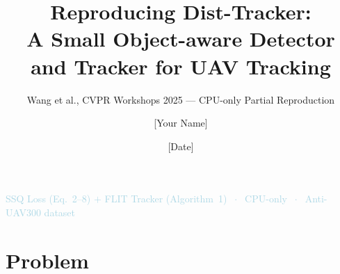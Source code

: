 \documentclass[aspectratio=169, 10pt]{beamer}
\title[Dist-Tracker Reproduction]{%
  Reproducing Dist-Tracker:\\
  A Small Object-aware Detector and Tracker for UAV Tracking}
\subtitle{Wang et al., CVPR Workshops 2025 — CPU-only Partial Reproduction}
\author{[Your Name]}
\date{[Date]}
\institute{[Your Institution]}
\begin{document}

\begin{frame}[plain]
  \titlepage
  \vspace{-1em}
  \begin{center}
    \small\textcolor{lightblue}{%
      SSQ Loss (Eq.~2--8) $+$ FLIT Tracker (Algorithm~1)
      $\;\cdot\;$ CPU-only $\;\cdot\;$ Anti-UAV300 dataset}
  \end{center}
\end{frame}

\section{Problem}
\end{document}

